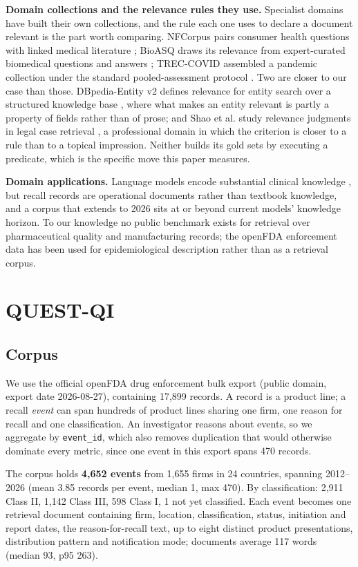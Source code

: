 \documentclass[acmsmall]{acmart}
\begin{document}
\textbf{Domain collections and the relevance rules they use.} Specialist domains have built their own collections, and the rule each one uses to declare a document relevant is the part worth comparing. NFCorpus pairs consumer health questions with linked medical literature \cite{boteva2016nfcorpus}; BioASQ draws its relevance from expert-curated biomedical questions and answers \cite{tsatsaronis2015bioasq}; TREC-COVID assembled a pandemic collection under the standard pooled-assessment protocol \cite{voorhees2020treccovid}. Two are closer to our case than those. DBpedia-Entity v2 defines relevance for entity search over a structured knowledge base \cite{hasibi2017dbpedia}, where what makes an entity relevant is partly a property of fields rather than of prose; and Shao et al. study relevance judgments in legal case retrieval \cite{shao2023legal}, a professional domain in which the criterion is closer to a rule than to a topical impression. Neither builds its gold sets by executing a predicate, which is the specific move this paper measures.

\textbf{Domain applications.} Language models encode substantial clinical knowledge \cite{singhal2022clinicalknowledge}, but recall records are operational documents rather than textbook knowledge, and a corpus that extends to 2026 sits at or beyond current models' knowledge horizon. To our knowledge no public benchmark exists for retrieval over pharmaceutical quality and manufacturing records; the openFDA enforcement data \cite{openfda_enforcement} has been used for epidemiological description rather than as a retrieval corpus.


\section{QUEST-QI}

\subsection{Corpus}
We use the official openFDA drug enforcement bulk export (public domain, export date 2026-08-27), containing 17,899 records. A record is a product line; a recall \textit{event} can span hundreds of product lines sharing one firm, one reason for recall and one classification. An investigator reasons about events, so we aggregate by \texttt{event\_id}, which also removes duplication that would otherwise dominate every metric, since one event in this export spans 470 records.

The corpus holds \textbf{4,652 events} from 1,655 firms in 24 countries, spanning 2012--2026 (mean 3.85 records per event, median 1, max 470). By classification: 2,911 Class II, 1,142 Class III, 598 Class I, 1 not yet classified. Each event becomes one retrieval document containing firm, location, classification, status, initiation and report dates, the reason-for-recall text, up to eight distinct product presentations, distribution pattern and notification mode; documents average 117 words (median 93, p95 263).
\end{document}
